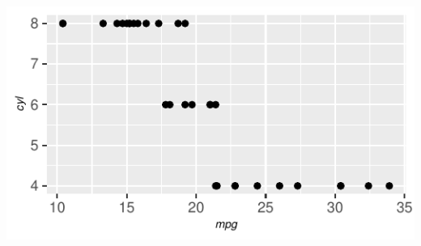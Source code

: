 \documentclass[
  12pt,
  a4paper,
]{article}
\begin{document}
\begin{center}\includegraphics{standard_pagedown_template_files/figure-latex/unnamed-chunk-6-1} \end{center}
\end{document}
